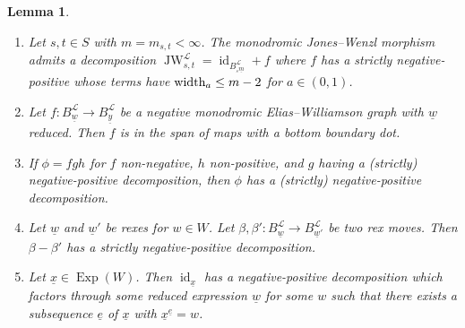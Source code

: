 \documentclass{amsart}
\newcommand{\scrL}{\mathcal{L}}
\DeclareMathOperator{\id}{id}
\DeclareMathOperator{\JW}{JW}
\DeclareMathOperator{\Exp}{Exp}
\newcommand{\ue}{\underline{e}}
\newcommand{\uw}{\underline{w}}
\newcommand{\ux}{\underline{x}}
\newcommand{\uy}{\underline{y}}
\newtheorem{lemma}[subsubsection]{Lemma}
\theoremstyle{definition}
\numberwithin{equation}{subsection}
\begin{document}
\begin{lemma}\label{lem:neg_pos_decomps}
    \begin{enumerate}
        \item Let $s, t\in S$ with $m = m_{s,t} < \infty$. The monodromic Jones--Wenzl morphism admits a decomposition $\JW_{s,t}^{\scrL} = \id_{B_{{}_s \underline{m}}^{\scrL} } + f$ where $f$ has a strictly negative-positive whose terms have $\textnormal{width}_a \leq m-2$ for $a \in (0,1)$.
        \item Let $f : B_{\uw}^{\scrL} \to B_{\uy}^{\scrL}$ be a negative monodromic Elias--Williamson graph with $\uw$ reduced. Then $f$ is in the span of maps with a bottom boundary dot.
        \item If $\phi = f g h$ for $f$ non-negative, $h$ non-positive, and $g$ having a (strictly) negative-positive decomposition, then $\phi$ has a (strictly) negative-positive decomposition.
        \item Let $\uw$ and $\uw'$ be rexes for $w \in W$. Let $\beta, \beta' : B_{\uw}^{\scrL} \to B_{\uw'}^{\scrL}$ be two rex moves. Then $\beta - \beta'$ has a strictly negative-positive decomposition.
        \item Let $\ux \in \Exp (W)$. Then $\id_{\ux}$ has a negative-positive decomposition which factors through some reduced expression $\uw$ for some $w$ such that there exists a subsequence $\ue$ of $\ux$ with $\ux^{\ue} = w$.
    \end{enumerate}
\end{lemma}
\end{document}
